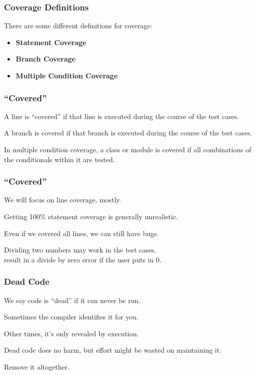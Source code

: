 \begin{frame}
\frametitle{Coverage Definitions}
\begin{changemargin}{1cm}

There are some different definitions for coverage:
\begin{itemize}
	\item \textbf{Statement Coverage} 
	\item \textbf{Branch Coverage} 
	\item \textbf{Multiple Condition Coverage} 
\end{itemize}

\end{changemargin}
\end{frame}


\begin{frame}
\frametitle{``Covered''}
\begin{changemargin}{1cm}

A line is ``covered'' if that line is executed during the course of the test cases. 

A branch is covered if that branch is executed during the course of the test cases. 

In multiple condition coverage, a class or module is covered if all combinations of the conditionals within it are tested.
\end{changemargin}
\end{frame}


\begin{frame}
\frametitle{``Covered''}
\begin{changemargin}{1cm}
We will focus on line coverage, mostly.


Getting 100\% statement coverage is generally unrealistic.

Even if we covered all lines, we can still have bugs.

Dividing two numbers may work in the test cases. \\
\quad result in a divide by zero error if the user puts in 0. 


\end{changemargin}
\end{frame}

\begin{frame}
\frametitle{Dead Code}
\begin{changemargin}{1cm}
We say code is ``dead'' if it can never be run.

Sometimes the compiler identifies it for you.

Other times, it's only revealed by execution.

Dead code does no harm, but effort might be wasted on maintaining it.

Remove it altogether.

\end{changemargin}
\end{frame}

